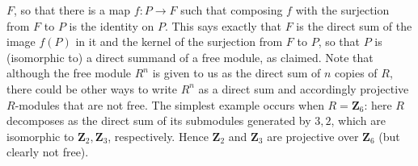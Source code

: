 \documentclass[10pt]{article}
\begin{document}
$F$, so that there is a map $f:P\rightarrow F$ such that composing $f$
with the surjection from $F$ to $P$ is the identity on $P$. This says
exactly that $F$ is the direct sum of the image $f(P)$ in it and the
kernel of the surjection from $F$ to $P$, so that $P$ is (isomorphic to)
a direct summand of a free module, as claimed. Note that although the
free module $R^n$ is given to us as the direct sum of $n$ copies of $R$,
there could be other ways to write $R^n$ as a direct sum and accordingly
projective $R$-modules that are not free. The simplest example occurs
when $R = \mathbf{Z}_6$: here $R$ decomposes as the direct sum of its
submodules generated by $3,2$, which are isomorphic to
$\mathbf{Z}_2,\mathbf{Z}_3$, respectively. Hence $\mathbf{Z}_2$ and
$\mathbf{Z}_3$ are projective over $\mathbf{Z}_6$ (but clearly not
free).
\end{document}
